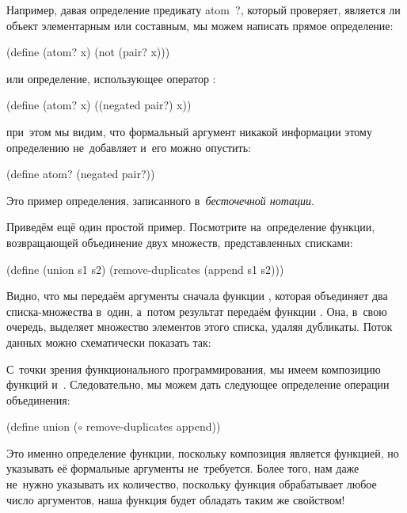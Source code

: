 Например, давая определение предикату \si{atom?}, который проверяет, является ли объект элементарным или составным, мы можем написать прямое определение:

\begin{SchemeCode}[emph=x]
(define (atom? x) 
  (not (pair? x)))
\end{SchemeCode}
\noindent или определение, использующее оператор :
\begin{SchemeCode}[emph=x]
(define (atom? x) 
  ((negated pair?) x))
\end{SchemeCode}
\noindent при~этом мы видим, что формальный аргумент  никакой информации этому определению не~добавляет и~его можно опустить:
\vspace{-\bigskipamount}
\begin{SchemeCode}
(define atom? (negated pair?))
\end{SchemeCode}
\noindent Это пример определения, записанного в~\emph{бесточечной нотации}.

\label{union}Приведём ещё один простой пример. Посмотрите на~определение функции, возвращающей объединение двух множеств, представленных списками:
\begin{SchemeCode}[emph={s1,s2}]
(define (union s1 s2)
  (remove-duplicates (append s1 s2)))
\end{SchemeCode}
\noindent Видно, что мы передаём аргументы сначала функции , которая объединяет два списка-множества в~один, а~потом результат передаём функции . Она, в~свою очередь, выделяет множество элементов этого списка, удаляя дубликаты. Поток данных можно схематически показать так:
\begin{center}
\end{center}

\noindent С~точки зрения функционального программирования, мы имеем композицию функций  и~. Следовательно, мы можем дать следующее определение операции объединения:

\begin{SchemeCode}
(define union ($\circ$ remove-duplicates append))
\end{SchemeCode}

Это именно определение функции, поскольку композиция является функцией, но указывать её формальные аргументы не~требуется. Более того, нам даже не~нужно указывать их количество, поскольку функция  обрабатывает любое число аргументов, наша функция  будет обладать таким же свойством!

